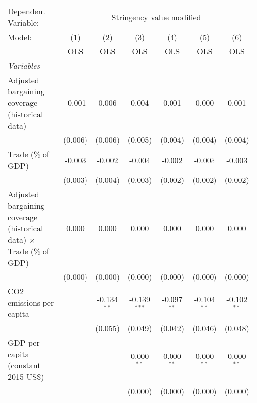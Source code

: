 
\begingroup
\centering
\begin{tabular}{lcccccc}
   \toprule
   Dependent Variable: & \multicolumn{6}{c}{Stringency value modified}\\
   Model:                                                                      & (1)     & (2)           & (3)            & (4)           & (5)           & (6)\\  
                                                                               &  OLS    & OLS           & OLS            & OLS           & OLS           & OLS\\  
   \midrule
   \emph{Variables}\\
   Adjusted bargaining coverage (historical data)                              & -0.001  & 0.006         & 0.004          & 0.001         & 0.000         & 0.001\\   
                                                                               & (0.006) & (0.006)       & (0.005)        & (0.004)       & (0.004)       & (0.004)\\   
   Trade (\% of GDP)                                                           & -0.003  & -0.002        & -0.004         & -0.002        & -0.003        & -0.003\\   
                                                                               & (0.003) & (0.004)       & (0.003)        & (0.002)       & (0.002)       & (0.002)\\   
   Adjusted bargaining coverage (historical data) $\times$ Trade (\% of GDP)   & 0.000   & 0.000         & 0.000          & 0.000         & 0.000         & 0.000\\   
                                                                               & (0.000) & (0.000)       & (0.000)        & (0.000)       & (0.000)       & (0.000)\\   
   CO2 emissions per capita                                                    &         & -0.134$^{**}$ & -0.139$^{***}$ & -0.097$^{**}$ & -0.104$^{**}$ & -0.102$^{**}$\\   
                                                                               &         & (0.055)       & (0.049)        & (0.042)       & (0.046)       & (0.048)\\   
   GDP per capita (constant 2015 US\$)                                         &         &               & 0.000$^{**}$   & 0.000$^{**}$  & 0.000$^{**}$  & 0.000$^{**}$\\   
                                                                               &         &               & (0.000)        & (0.000)       & (0.000)       & (0.000)\\   

\end{tabular}
